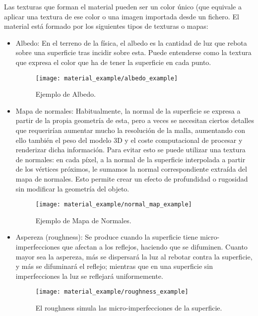 Las texturas que forman el material pueden ser un color único (que equivale a aplicar una textura de ese color o una imagen importada desde un fichero. El material está formado por los siguientes tipos de texturas o mapas:

\begin{itemize}
    \item Albedo: En el terreno de la física, el albedo es la cantidad de luz que rebota sobre una superficie tras incidir sobre esta\cite{def_albedo}. Puede entenderse como la textura que expresa el color que ha de tener la superficie en cada punto.
    \begin{figure}[H]
        \centering
        \texttt{[image: material\_example/albedo\_example]}
        \caption{Ejemplo de Albedo\cite{free_pbr}.}
        \label{fig:albedo_ex}
    \end{figure}
    \item Mapa de normales: Habitualmente, la normal de la superficie se expresa a partir de la propia geometría de esta, pero a veces se necesitan ciertos detalles que requerirían aumentar mucho la resolución de la malla, aumentando con ello también el peso del modelo 3D y el coste computacional de procesar y renderizar dicha información. Para evitar esto se puede utilizar una textura de normales: en cada píxel, a la normal de la superficie interpolada a partir de los vértices próximos, le sumamos la normal correspondiente extraída del mapa de normales. Esto permite crear un efecto de profundidad o rugosidad sin modificar la geometría del objeto.
    \begin{figure}[H]
        \centering
        \texttt{[image: material\_example/normal\_map\_example]}
        \caption{Ejemplo de Mapa de Normales\cite{free_pbr}.}
        \label{fig:normal_map_ex}
    \end{figure}
    \item Aspereza (roughness): Se produce cuando la superficie tiene micro-imperfecciones que afectan a los reflejos, haciendo que se difuminen. Cuanto mayor sea la aspereza, más se dispersará la luz al rebotar contra la superficie, y más se difuminará el reflejo; mientras que en una superficie sin imperfecciones la luz se reflejará uniformemente.
    \begin{figure}[H]
        \centering
        \texttt{[image: material\_example/roughness\_example]}
        \caption{El roughness simula las micro-imperfecciones de la superficie.}
        \label{fig:roughness_ex}
    \end{figure}

\end{itemize}

